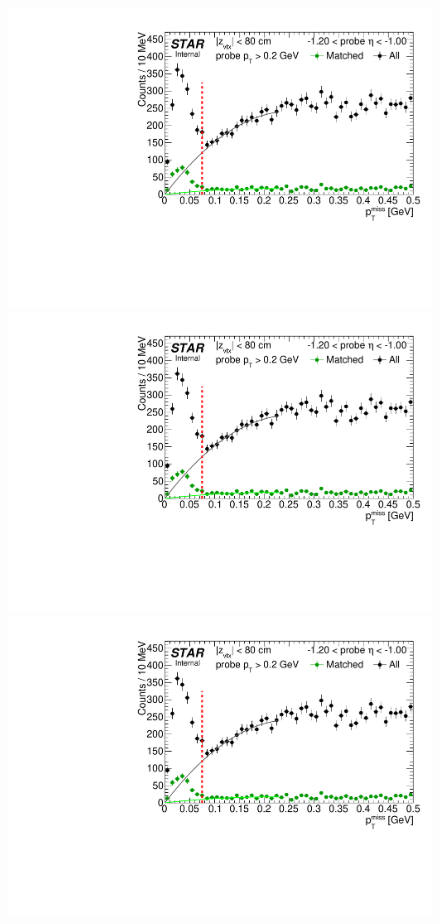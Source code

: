 \begin{figure}[ht]\ContinuedFloat
\centering
\parbox{0.495\textwidth}{
  \centering
  \includegraphics[width=\linewidth,page=3]{graphics/systematicsEfficiency/TOF_tagAndProbe/Fitting_effVsEta_data.pdf}\\
  \includegraphics[width=\linewidth,page=4]{graphics/systematicsEfficiency/TOF_tagAndProbe/Fitting_effVsEta_data.pdf}\\
  \includegraphics[width=\linewidth,page=5]{graphics/systematicsEfficiency/TOF_tagAndProbe/Fitting_effVsEta_data.pdf}\\
}
\end{figure}
